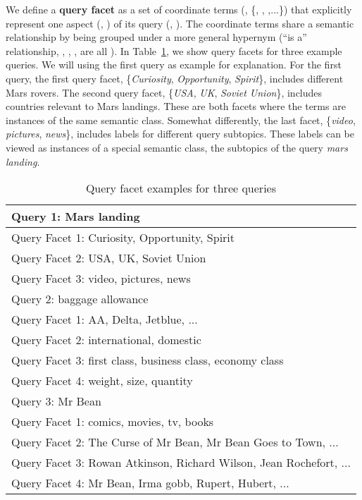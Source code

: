 We define a \textbf{query facet} as a set of coordinate terms (\eg, \{, , ,...\}) that explicitly represent one aspect (\eg, ) of its query (\eg, ). The coordinate terms share a semantic relationship by being grouped under a more general hypernym (``is a'' relationship, \eg, , ,  are all ). 
In Table~\ref{tab:facet-facetexample}, we show query facets for three example queries. We will using the first query  as example for explanation. For the first query, the first query facet, \{\textit{Curiosity}, \textit{Opportunity}, \textit{Spirit}\}, includes different Mars rovers. The second query facet, \{\textit{USA}, \textit{UK}, \textit{Soviet Union}\}, includes countries relevant to Mars landings. These are both facets where the terms are instances of the same semantic class. 
Somewhat differently, the last facet, \{\textit{video}, \textit{pictures}, \textit{news}\}, includes labels for different query subtopics. These labels can be viewed as instances of a special semantic class, the subtopics of the query \textit{mars landing}. 
\begin{table}[ht!]
\centering
\caption{Query facet examples for three queries}
\label{tab:facet-facetexample}
\begin{tabular}{|l|} \hline
Query 1: Mars landing \\\hline
Query Facet 1: Curiosity, Opportunity, Spirit \\
Query Facet 2: USA, UK, Soviet Union \\
Query Facet 3: video, pictures, news \\\hhline{|=|}
Query 2: baggage allowance \\\hline
Query Facet 1: AA, Delta, Jetblue,  ... \\
Query Facet 2: international, domestic \\
Query Facet 3: first class, business class, economy class \\
Query Facet 4: weight, size, quantity \\\hhline{|=|}
Query 3: Mr Bean \\\hline
Query Facet 1: comics, movies, tv, books \\
Query Facet 2: The Curse of Mr Bean, Mr Bean Goes to Town, ...\\
Query Facet 3: Rowan Atkinson, Richard Wilson, Jean Rochefort,  ...\\ 
Query Facet 4: Mr Bean, Irma gobb, Rupert, Hubert, ...\\\hline
\end{tabular}
\end{table}


